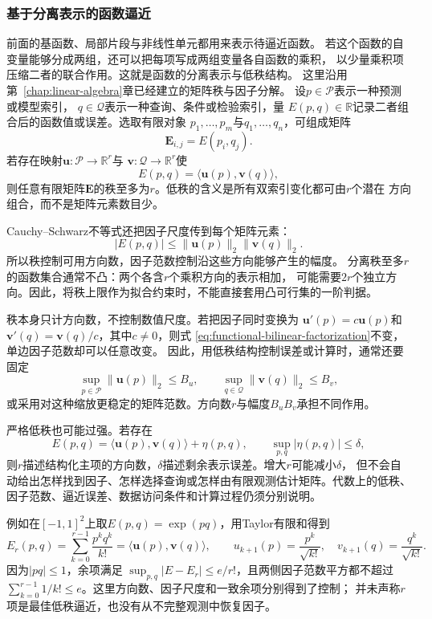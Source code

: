 \subsubsection{基于分离表示的函数逼近}
\label{sec:functional-separated-approximation}

前面的基函数、局部片段与非线性单元都用来表示待逼近函数。
若这个函数的自变量能够分成两组，还可以把每项写成两组变量各自函数的乘积，
以少量乘积项压缩二者的联合作用。这就是函数的分离表示与低秩结构。
这里沿用第~\ref{chap:linear-algebra}章已经建立的矩阵秩与因子分解。
设$p\in\mathcal{P}$表示一种预测或模型索引，
$q\in\mathcal{Q}$表示一种查询、条件或检验索引，量
$E(p,q)\in\mathbb{R}$记录二者组合后的函数值或误差。选取有限对象
$p_1,\ldots,p_m$与$q_1,\ldots,q_n$，可组成矩阵
\[
  \bm{E}_{i,j}=E(p_i,q_j).
\]
若存在映射$\bm{u}:\mathcal{P}\to\mathbb{R}^r$与
$\bm{v}:\mathcal{Q}\to\mathbb{R}^r$使
\begin{equation}
  E(p,q)
  =
  \langle\bm{u}(p),\bm{v}(q)\rangle,
  \label{eq:functional-bilinear-factorization}
\end{equation}
则任意有限矩阵$\bm{E}$的秩至多为$r$。低秩的含义是所有双索引变化都可由$r$个潜在
方向组合，而不是矩阵元素数目少。

Cauchy--Schwarz不等式还把因子尺度传到每个矩阵元素：
\[
  |E(p,q)|
  \leq
  \lVert\bm{u}(p)\rVert_2
  \lVert\bm{v}(q)\rVert_2.
\]
所以秩控制可用方向数，因子范数控制沿这些方向能够产生的幅度。
分离秩至多$r$的函数集合通常不凸：两个各含$r$个乘积方向的表示相加，
可能需要$2r$个独立方向。因此，将秩上限作为拟合约束时，不能直接套用凸可行集的一阶判据。

秩本身只计方向数，不控制数值尺度。若把因子同时变换为
$\bm{u}'(p)=c\bm{u}(p)$和
$\bm{v}'(q)=\bm{v}(q)/c$，其中$c\neq0$，则式
\eqref{eq:functional-bilinear-factorization}不变，单边因子范数却可以任意改变。
因此，用低秩结构控制误差或计算时，通常还要固定
\[
  \sup_{p\in\mathcal{P}}\lVert\bm{u}(p)\rVert_2\leq B_u,
  \qquad
  \sup_{q\in\mathcal{Q}}\lVert\bm{v}(q)\rVert_2\leq B_v,
\]
或采用对这种缩放更稳定的矩阵范数。方向数$r$与幅度$B_uB_v$承担不同作用。

严格低秩也可能过强。若存在
\[
  E(p,q)
  =
  \langle\bm{u}(p),\bm{v}(q)\rangle+\eta(p,q),
  \qquad
  \sup_{p,q}|\eta(p,q)|\leq\delta,
\]
则$r$描述结构化主项的方向数，$\delta$描述剩余表示误差。增大$r$可能减小$\delta$，
但不会自动给出怎样找到因子、怎样选择查询或怎样由有限观测估计矩阵。代数上的低秩、
因子范数、逼近误差、数据访问条件和计算过程仍须分别说明。

例如在$[-1,1]^2$上取$E(p,q)=\exp(pq)$，用Taylor有限和得到
\[
 E_r(p,q)=\sum_{k=0}^{r-1}\frac{p^kq^k}{k!}
 =\langle\bm u(p),\bm v(q)\rangle,\qquad
 u_{k+1}(p)=\frac{p^k}{\sqrt{k!}},\quad
 v_{k+1}(q)=\frac{q^k}{\sqrt{k!}}.
\]
因为$|pq|\leq1$，余项满足
$\sup_{p,q}|E-E_r|\leq e/r!$，且两侧因子范数平方都不超过
$\sum_{k=0}^{r-1}1/k!\leq e$。这里方向数、因子尺度和一致余项分别得到了控制；
并未声称$r$项是最佳低秩逼近，也没有从不完整观测中恢复因子。

